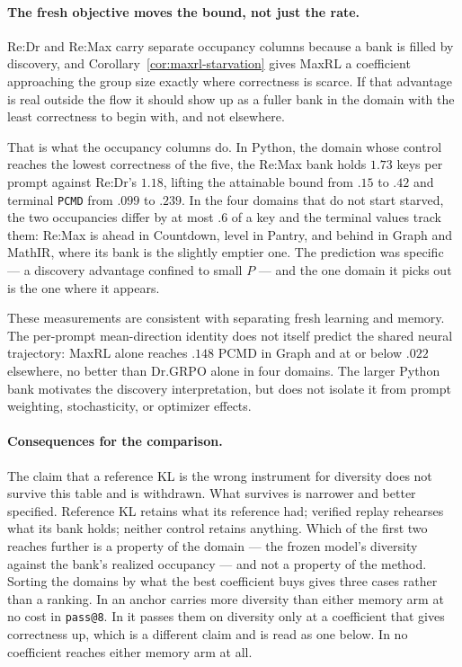 \documentclass{article}
\newcommand{\1}{\mathbf 1}
\newcommand{\pmd}{\texttt{PCMD}}
\theoremstyle{remark}
\theoremstyle{definition}
\theoremstyle{plain}
\begin{document}
\paragraph{The fresh objective moves the bound, not just the rate.}
Re:Dr and Re:Max carry separate occupancy columns because a bank is filled by
discovery, and Corollary~\ref{cor:maxrl-starvation} gives MaxRL a coefficient
approaching the group size exactly where correctness is scarce. If that
advantage is real outside the flow it should show up as a fuller bank in the
domain with the least correctness to begin with, and not elsewhere.

That is what the occupancy columns do. In Python, the domain whose control
reaches the lowest correctness of the five, the Re:Max bank holds $1.73$ keys
per prompt against Re:Dr's $1.18$, lifting the attainable bound from $.15$ to
$.42$ and terminal \pmd{} from $.099$ to $.239$. In the four domains that do
not start starved, the two occupancies differ by at most $.6$ of a key and the
terminal values track them: Re:Max is ahead in Countdown, level in Pantry, and
behind in Graph and MathIR, where its bank is the slightly emptier one. The
prediction was specific --- a discovery advantage confined to small $P$ --- and
the one domain it picks out is the one where it appears.

These measurements are consistent with separating fresh learning and
memory. The per-prompt mean-direction identity does not itself predict the
shared neural trajectory: MaxRL alone reaches $.148$ PCMD in Graph and at
or below $.022$ elsewhere, no better than Dr.GRPO alone in four domains.
The larger Python bank motivates the discovery interpretation, but does not
isolate it from prompt weighting, stochasticity, or optimizer effects.

\paragraph{Consequences for the comparison.}
The claim that a reference KL is the wrong instrument for diversity does not
survive this table and is withdrawn. What survives is narrower and better
specified. Reference KL retains what its reference had; verified replay
rehearses what its bank holds; neither control retains anything. Which of the
first two reaches further is a property of the domain --- the frozen model's
diversity against the bank's realized occupancy --- and not a property of the
method. Sorting the domains by what the best coefficient buys gives three
cases rather than a ranking. In \MDklFreeNames{} an anchor carries more diversity than
either memory arm at no cost in \texttt{pass@8}. In \MDklPricedNames{} it
passes them on diversity only at a coefficient that gives correctness up, which
is a different claim and is read as one below. In \MDklMemoryNames{} no
coefficient reaches either memory arm at all.
\end{document}
